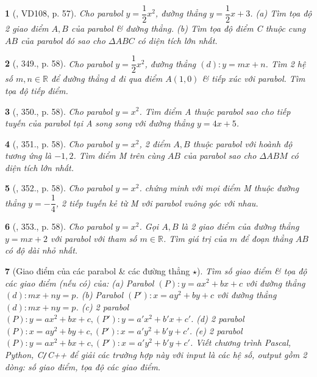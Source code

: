 \documentclass{article}
\newtheorem{baitoan}{}
\begin{document}
\begin{baitoan}[\cite{Binh_Toan_9_tap_2}, VD108, p. 57]
	Cho parabol $y = \dfrac{1}{2}x^2$, đường thẳng $y = \dfrac{1}{2}x + 3$. (a) Tìm tọa độ 2 giao điểm $A,B$ của parabol \& đường thẳng. (b) Tìm tọa độ điểm C thuộc cung $AB$ của parabol đó sao cho $\Delta ABC$ có diện tích lớn nhất.
\end{baitoan}

\begin{baitoan}[\cite{Binh_Toan_9_tap_2}, 349., p. 58]
	Cho parabol $y = \dfrac{1}{2}x^2$, đường thẳng $(d):y = mx + n$. Tìm 2 hệ số $m,n\in\mathbb{R}$ để đường thẳng $d$ đi qua điểm $A(1,0)$ \& tiếp xúc với parabol. Tìm tọa độ tiếp điểm.
\end{baitoan}

\begin{baitoan}[\cite{Binh_Toan_9_tap_2}, 350., p. 58]
	Cho parabol $y = x^2$. Tìm điểm A thuộc parabol sao cho tiếp tuyến của parabol tại A song song với đường thẳng $y = 4x + 5$.
\end{baitoan}

\begin{baitoan}[\cite{Binh_Toan_9_tap_2}, 351., p. 58]
	Cho parabol $y = x^2$, 2 điểm $A,B$ thuộc parabol với hoành độ tương ứng là $-1,2$. Tìm điểm M trên cùng $AB$ của parabol sao cho $\Delta ABM$ có diện tích lớn nhất.
\end{baitoan}

\begin{baitoan}[\cite{Binh_Toan_9_tap_2}, 352., p. 58]
	Cho parabol $y = x^2$. chứng minh với mọi điểm M thuộc đường thẳng $y = -\dfrac{1}{4}$, 2 tiếp tuyến kẻ từ M với parabol vuông góc với nhau.
\end{baitoan}

\begin{baitoan}[\cite{Binh_Toan_9_tap_2}, 353., p. 58]
	Cho parabol $y = x^2$. Gọi $A,B$ là 2 giao điểm của đường thẳng $y = mx + 2$ với parabol với tham số $m\in\mathbb{R}$. Tìm giá trị của $m$ để đoạn thẳng $AB$ có độ dài nhỏ nhất.
\end{baitoan}

\begin{baitoan}[Giao điểm của các parabol \& các đường thẳng $\star$]
	Tìm số giao điểm \& tọa độ các giao điểm (nếu có) của: (a) Parabol $(P):y = ax^2 + bx + c$ với đường thẳng $(d):mx + ny = p$. (b) Parabol $(P'):x = ay^2 + by + c$ với đường thẳng $(d):mx + ny = p$. (c) 2 parabol $(P):y = ax^2 + bx + c,(P'):y = a'x^2 + b'x + c'$. (d) 2 parabol $(P):x = ay^2 + by + c,(P'):x = a'y^2 + b'y + c'$. (e) 2 parabol $(P):y = ax^2 + bx + c,(P'):x = a'y^2 + b'y + c'$. Viết chương trình {\sf Pascal, Python, C{\tt/}C++} để giải các trường hợp này với input là các hệ số, output gồm 2 dòng: số giao điểm, tọa độ các giao điểm.
\end{baitoan}
\end{document}
